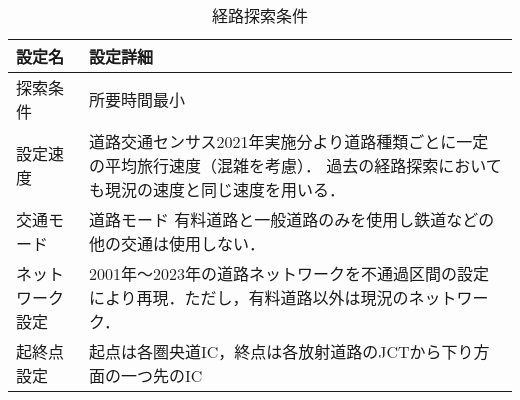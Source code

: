 \begin{table}[h!]
  \centering
  \renewcommand{\arraystretch}{1.2} %
  \begin{tabularx}{\textwidth}{p{}   X}
  \toprule
  \textbf{設定名}     &\textbf{設定詳細}                                 \\
  \midrule
  探索条件            & 所要時間最小                                  \\
  設定速度            & 道路交通センサス2021年実施分より道路種類ごとに一定の平均旅行速度（混雑を考慮）．\cite{kokudo2021} 過去の経路探索においても現況の速度と同じ速度を用いる．           \\
  交通モード            & 道路モード 有料道路と一般道路のみを使用し鉄道などの他の交通は使用しない．                                  \\
  ネットワーク設定          & 2001年〜2023年の道路ネットワークを不通過区間の設定により再現．ただし，有料道路以外は現況のネットワーク．                                  \\
  起終点設定            & 起点は各圏央道IC，終点は各放射道路のJCTから下り方面の一つ先のIC                               \\
  \bottomrule
  \end{tabularx}
  \caption{経路探索条件}
  \label{conditions of search}
  \end{table}
  

